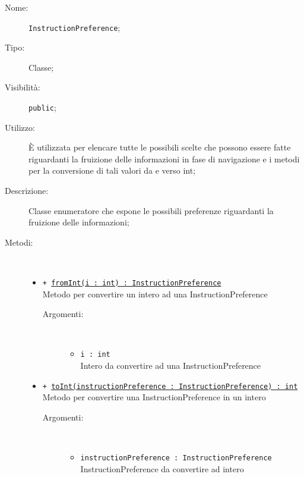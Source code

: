 \documentclass[../DefinizioneDiProdotto.tex]{subfiles}
\begin{document}
\begin{description}
	\item[Nome:] \texttt{InstructionPreference};
	\item[Tipo:] Classe;
	\item[Visibilità:] \texttt{public};
	\item[Utilizzo:] È utilizzata per elencare tutte le possibili scelte che possono essere fatte riguardanti la fruizione delle informazioni in fase di navigazione e i metodi per la conversione di tali valori da e verso int;
	\item[Descrizione:] Classe enumeratore che espone le possibili preferenze riguardanti la fruizione delle informazioni;
	\item[Metodi:] \
	\begin{itemize}
		\item \texttt{+ \underline{fromInt(i : int) : InstructionPreference}}\\
		Metodo per convertire un intero ad una InstructionPreference
		\begin{description}
			\item[Argomenti:] \
			\begin{itemize}
				\item \texttt{i : int}\\
				Intero da convertire ad una InstructionPreference\end{itemize}
		\end{description}
		\item \texttt{+ \underline{toInt(instructionPreference : InstructionPreference) : int}}\\
		Metodo per convertire una InstructionPreference in un intero
		\begin{description}
			\item[Argomenti:] \
			\begin{itemize}
				\item \texttt{instructionPreference : InstructionPreference}\\
				InstructionPreference da convertire ad intero\end{itemize}
		\end{description}
	\end{itemize}
\end{description}
\end{document}
